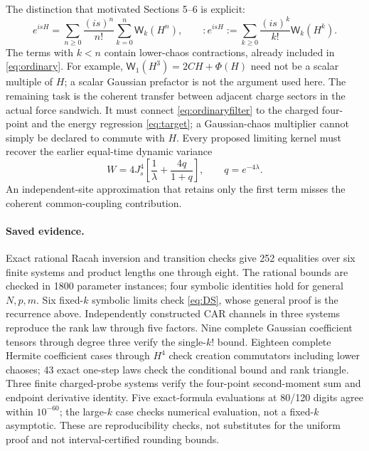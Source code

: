 \documentclass[11pt,a4paper]{article}
\newcommand{\W}{\mathsf W}
\begin{document}
The distinction that motivated Sections 5--6 is explicit:
\begin{equation}
 e^{isH}=\sum_{n\ge0}\frac{(is)^n}{n!}
          \sum_{k=0}^n\W_k(H^n),
 \qquad
 :e^{isH}:=\sum_{k\ge0}\frac{(is)^k}{k!}\W_k(H^k).
\end{equation}
The terms with $k<n$ contain lower-chaos contractions, already
included in \eqref{eq:ordinary}. For example,
$\W_1(H^3)=2CH+\Phi(H)$ need not be a scalar multiple of $H$;
a scalar Gaussian prefactor is not the argument used here.
The remaining task is the coherent transfer between adjacent
charge sectors in the actual force sandwich. It must connect
\eqref{eq:ordinaryfilter} to the charged four-point and the
energy regression \eqref{eq:target}; a Gaussian-chaos multiplier
cannot simply be declared to commute with $H$.
Every proposed limiting kernel must recover the earlier equal-time
dynamic variance
\begin{equation}
 W=4J_s^4\left[\frac1\lambda+\frac{4q}{1+q}\right],
 \qquad q=e^{-4\lambda}.
\end{equation}
An independent-site approximation that retains only the first term
misses the coherent common-coupling contribution.

\paragraph{Saved evidence.}
Exact rational Racah inversion and transition checks give 252
equalities over six finite systems and product lengths one through
eight. The rational bounds are checked in 1800 parameter instances;
four symbolic identities hold for general $N,p,m$. Six fixed-$k$
symbolic limits check \eqref{eq:DS}, whose general proof is the
recurrence above. Independently constructed CAR channels in three
systems reproduce the rank law through five factors. Nine complete
Gaussian coefficient tensors through degree three verify the
single-$k!$ bound. Eighteen complete Hermite coefficient cases
through $H^4$ check creation commutators including lower chaoses;
43 exact one-step laws check the conditional bound and rank triangle.
Three finite charged-probe systems verify the
four-point second-moment sum and endpoint derivative identity.
Five exact-formula evaluations at 80/120 digits agree within
$10^{-60}$; the large-$k$ case checks numerical evaluation, not a
fixed-$k$ asymptotic. These are reproducibility checks, not substitutes
for the uniform proof and not interval-certified rounding bounds.
\end{document}
